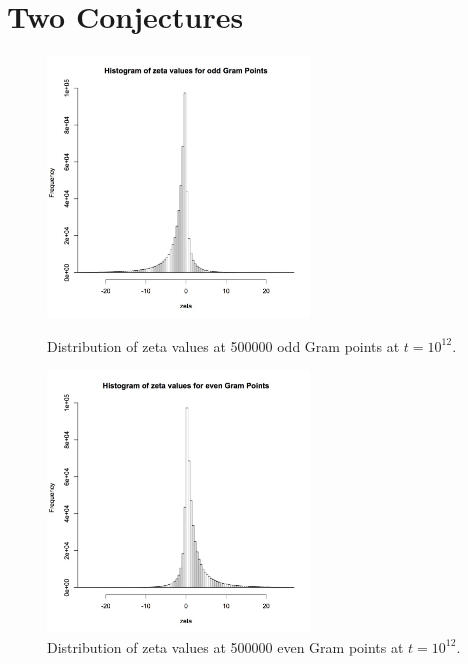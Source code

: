 \documentclass[twoside]{article}
\theoremstyle{definition}
\begin{document}
\section{\label{sec7}Two Conjectures}

\begin{figure}
\centering
\includegraphics[width=0.62\textwidth]{ozeta.jpg}
\caption[]{ 
  Distribution of zeta values at 500000 odd Gram points  at $t = 10^{12}$.
 }
\vspace{1mm}
\label{oddhist}

\includegraphics[width=0.62\textwidth]{ezeta.jpg}
\caption[]{ 
   Distribution of zeta values at 500000 even Gram points  at $t = 10^{12}$.
 }
\label{evenhist}
\vspace{1mm}
\end{figure}
\end{document}
